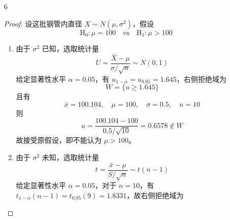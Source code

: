 \documentclass[normal,founder,mtpro2,cn]{elegantnote}
\begin{document}
\begin{enumerate}
\begin{proof}
            且有
            \begin{equation*}
                \bar{x}=14.9,\quad\mu=15,\quad\sigma=0.05,\quad n=6
            \end{equation*}
            则
            \begin{equation*}
                u=\frac{14.9-15}{0.05/\sqrt{6}}=-4.8990\in W
            \end{equation*}
            故拒绝原假设，即不能认为平均质量仍为 15g。
        \end{proof}
    \item[6]
        \begin{proof}
            设这批钢管内直径 $X\sim N\left(\mu,\sigma^{2}\right)$，假设
            \begin{equation*}
                \mathrm{H}_{0}:\mu=100\quad\text{vs}\quad\mathrm{H}_{1}:\mu>100
            \end{equation*}
            \begin{enumerate}
                \item 由于 $\sigma^{2}$ 已知，选取统计量
                      \begin{equation*}
                          U=\frac{\bar{X}-\mu}{\sigma/\sqrt{n}}\sim N(0,1)
                      \end{equation*}
                      给定显著性水平 $\alpha=0.05$，有 $u_{1-\alpha}=u_{0.95}=1.645$，右侧拒绝域为
                      \begin{equation*}
                          W=\{u \geq 1.645\}
                      \end{equation*}
                      且有
                      \begin{equation*}
                          \bar{x}=100.104,\quad\mu=100,\quad \sigma=0.5,\quad n=10
                      \end{equation*}
                      则
                      \begin{equation*}
                          u=\frac{100.104-100}{0.5/\sqrt{10}}=0.6578\notin W
                      \end{equation*}
                      故接受原假设，即不能认为 $\mu>100$。
                \item 由于 $\sigma^{2}$ 未知，选取统计量
                      \begin{equation*}
                          t=\frac{\bar{x}-\mu}{S/\sqrt{n}}\sim t(n-1)
                      \end{equation*}
                      给定显著性水平 $\alpha=0.05$，对于 $n=10$，有 $t_{1-\alpha}(n-1)=t_{0.95}(9)=1.8331$，故右侧拒绝域为

\end{enumerate}
\end{proof}
\end{enumerate}
\end{document}
